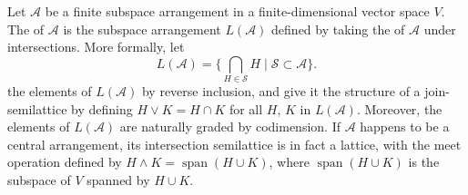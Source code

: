 \documentclass[12pt]{article}
\DeclareMathOperator{\Span}{span}
\theoremstyle{definition}
\newtheorem*{example*}{Example}
\begin{document}
Let $\mathcal{A}$ be a finite subspace arrangement in a 
finite-dimensional vector space $V$.
The {\em {}} of 
$\mathcal{A}$ is the subspace
arrangement $L(\mathcal{A})$ defined by taking the 
of $\mathcal{A}$ under intersections.  More formally, let
\[
L(\mathcal{A}) = \bigl\{ \bigcap_{H\in\mathcal{S}} H
                 \mid    \mathcal{S}\subset\mathcal{A}
                 \bigr\}.
\]
 the elements of $L(\mathcal{A})$ 
by reverse inclusion,
and give it the structure of a join-semilattice by defining
$H\vee K=H\cap K$ for all $H$, $K$ in $L(\mathcal{A})$.
Moreover, the elements of $L(\mathcal{A})$ are naturally 
graded by codimension.  If $\mathcal{A}$
happens to be a central arrangement, its intersection
semilattice is in fact a lattice, with the meet operation
defined by $H\wedge K=\Span(H\cup K)$, where 
$\Span(H\cup K)$ is the subspace of $V$ spanned by 
$H\cup K$.

\end{document}

